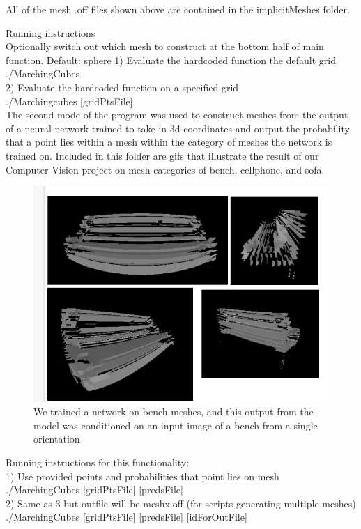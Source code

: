 \documentclass{article}
\begin{document}
\clearpage

All of the mesh .off files shown above are contained in the implicitMeshes folder.

Running instructions \\
Optionally switch out which mesh to construct at the bottom half of main function. Default: sphere
1) Evaluate the hardcoded function the default grid \\ 
   ./MarchingCubes   \\
2) Evaluate the hardcoded function on a specified grid \\
  ./Marchingcubes [gridPtsFile] \\


The second mode of the program was used to construct meshes from the output of a neural network
trained to take in 3d coordinates and output the probability that a point lies within a mesh within
the category of meshes the network is trained on. Included in this folder are gifs that illustrate the
result of our Computer Vision project on mesh categories of bench, cellphone, and sofa. 

\begin{figure}[h]
    \includegraphics[scale=0.5]{../report/benchImages/benches.png}
    \caption{We trained a network on bench meshes, and this output from the model was conditioned on an input image of a bench from a single orientation}
\end{figure}


Running instructions for this functionality: \\
1) Use provided points and probabilities that point lies on mesh   \\
  ./MarchingCubes [gridPtsFile] [predsFile] \\
2) Same as 3 but outfile will be mesh{x}.off (for scripts generating multiple meshes) \\
  ./MarchingCubes [gridPtsFile] [predsFile] [idForOutFile] \\
\end{document}
